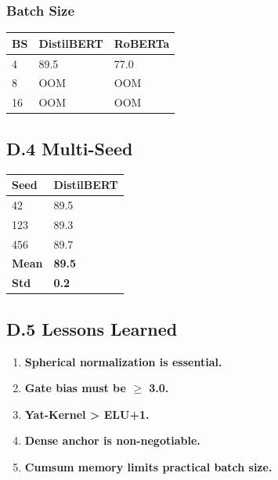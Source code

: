 \subsubsection{Batch Size}

\begin{table}[H]
\centering
\small
\begin{tabular}{lll}
\toprule
\textbf{BS} & \textbf{DistilBERT} & \textbf{RoBERTa} \\
\midrule
4 & 89.5 & 77.0 \\
8 & OOM & OOM \\
16 & OOM & OOM \\
\bottomrule
\end{tabular}
\end{table}

\subsection{D.4 Multi-Seed}

\begin{table}[H]
\centering
\small
\begin{tabular}{ll}
\toprule
\textbf{Seed} & \textbf{DistilBERT} \\
\midrule
42 & 89.5 \\
123 & 89.3 \\
456 & 89.7 \\
\textbf{Mean} & \textbf{89.5} \\
\textbf{Std} & \textbf{0.2} \\
\bottomrule
\end{tabular}
\end{table}

\subsection{D.5 Lessons Learned}

\begin{enumerate}
\item \textbf{Spherical normalization is essential.}
\item \textbf{Gate bias must be $\ge$ 3.0.}
\item \textbf{Yat-Kernel \textgreater{} ELU+1.}
\item \textbf{Dense anchor is non-negotiable.}
\item \textbf{Cumsum memory limits practical batch size.}

\end{enumerate}
